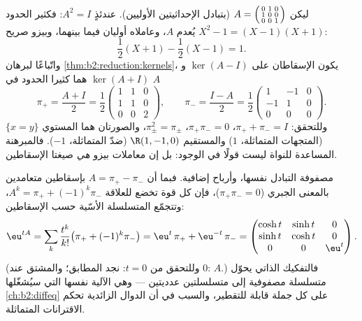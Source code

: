 \begin{example}\label{ex:b2:reduction:projectorswork}
ليكن $A = \begin{psmallmatrix}0 & 1 & 0\\ 1 & 0 & 0\\ 0 & 0 &
1\end{psmallmatrix}$ (بتبادل الإحداثيتين الأوليين). عندئذٍ $A^2
= I$: فكثير الحدود $X^2 - 1 = (X - 1)(X + 1)$ يُعدم $A$،
وعاملاه أوليان فيما بينهما، وبيزو صريح:
\[
\frac{1}{2}(X + 1) - \frac12(X - 1) = 1 .
\]
واتّباعًا لبرهان \cref{thm:b2:reduction:kernels}، يكون الإسقاطان
على $\ker(A - I)$ و$\ker(A + I)$ هما كثيرا الحدود في $A$
\[
\pi_+ = \frac{A + I}{2} = \frac12\begin{pmatrix}
1 & 1 & 0\\ 1 & 1 & 0\\ 0 & 0 & 2\end{pmatrix},
\qquad
\pi_- = \frac{I - A}{2} = \frac12\begin{pmatrix}
1 & -1 & 0\\ -1 & 1 & 0\\ 0 & 0 & 0\end{pmatrix}.
\]
وللتحقق: $\pi_+ + \pi_- = I$، $\pi_+\pi_- = 0$، $\pi_\pm^2 =
\pi_\pm$، والصورتان هما المستوي $\{x = y\}$ (المتجهات
المتماثلة،  $1$) والمستقيم $\R(1, -1, 0)$
(ضدّ المتماثلة،  $-1$). فالمبرهنة المساعدة للنواة ليست
قولًا في الوجود: بل إن معاملات بيزو \emph{هي}
صيغتا الإسقاطين.
\end{example}

\begin{example}\label{ex:b2:reduction:expprojectors}
مصفوفة التبادل نفسها، وأرباح إضافية. فبما أن $A = \pi_+ -
\pi_-$ بإسقاطين متعامدين بالمعنى الجبري
($\pi_+\pi_- = 0$)، فإن كل قوة تخضع للعلاقة $A^k = \pi_+ +
(-1)^k\pi_-$، وتتجمّع المتسلسلة الأسّية حسب الإسقاطين:
\[
\eu^{tA} = \sum_k \frac{t^k}{k!}\bigl(\pi_+ +
(-1)^k\pi_-\bigr)
= \eu^{t}\,\pi_+ + \eu^{-t}\,\pi_- =
\begin{pmatrix}
\cosh t & \sinh t & 0\\
\sinh t & \cosh t & 0\\
0 & 0 & \eu^{t}
\end{pmatrix}.
\]
(وللتحقق من $t = 0$: نجد المطابق؛ والمشتق عند $0$: $A$.) فالتفكيك
الذاتي يحوّل متسلسلة مصفوفية إلى متسلسلتين عدديتين ---
وهي الآلية نفسها التي سيُشغّلها \cref{ch:b2:diffeq} على كل
جملة قابلة للتقطير، والسبب في أن الدوال الزائدية تحكم
الاقترانات المتماثلة.
\end{example}


